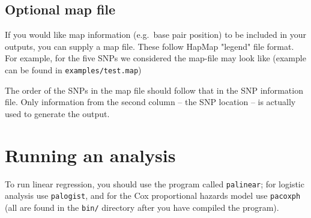 \documentclass[12pt,a4paper]{article}
\begin{document}
\subsection{Optional map file}
If you would like map information (e.g.~base pair position) to
be included in your outputs, you can supply a map file. These follow
HapMap "legend" file format. For example, for the five SNPs we considered
the map-file may look like (example can be found in
\texttt{examples/test.map})



The order of the SNPs in the map file should follow that in the SNP information
file. Only information from the second column -- the SNP location -- is
actually used to generate the output.

\section{Running an analysis}
\label{sec:runanalysis}
To run linear regression, you should use the program called
\texttt{palinear}; for logistic analysis use \texttt{palogist}, and
for the Cox proportional hazards model use \texttt{pacoxph} (all are
found in the \texttt{bin/} directory after you have compiled the
program).
\end{document}
